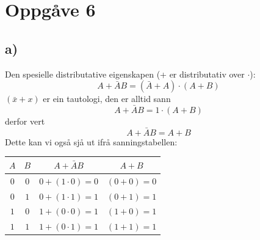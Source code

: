\documentclass[12pt,a4paper]{article}
\begin{document}
	\section{Oppgåve 6}
		\subsection{a)}
		Den spesielle distributative eigenskapen (+ er distributativ over $\cdot$):
		\begin{equation}
			A + \bar{A}B = (\bar{A} + A) \cdot (A + B)
		\end{equation}
		$(\bar{x} + x)$ er ein tautologi, den er alltid sann
		\begin{equation}
			A + \bar{A}B = 1 \cdot (A + B)
		\end{equation}
		derfor vert
		\begin{equation}
			A + \bar{A}B = A + B
		\end{equation}
		Dette kan vi også sjå ut ifrå sanningstabellen:

		\begin{center}
			\begin{tabular}{ |c|c|c|c| }
				\hline
				$A$	&	$B$	&	$A+\bar{A}B$	&	$A+B$ \\
				\hline
				$0$	&	$0$	&	$0+(1\cdot0)=0$	&	$(0+0)=0$ \\
				\hline
				$0$	&	$1$	&	$0+(1\cdot1)=1$	&	$(0+1)=1$ \\
				\hline
				$1$	&	$0$	&	$1+(0\cdot0)=1$	&	$(1+0)=1$ \\
				\hline
				$1$	&	$1$	&	$1+(0\cdot1)=1$	&	$(1+1)=1$ \\
				\hline
			\end{tabular}
		\end{center}

		\newpage
\end{document}
